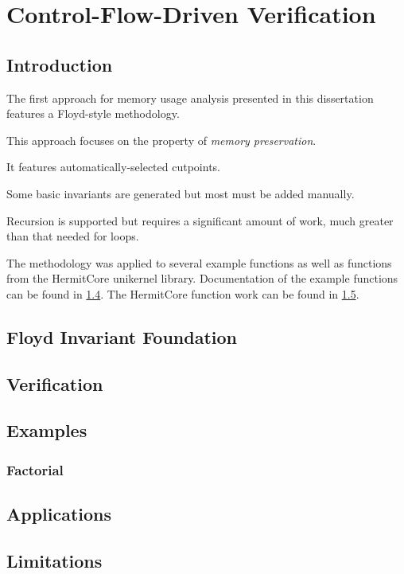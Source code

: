 \chapter{Control-Flow-Driven Verification}

\section{Introduction}\label{se:cfg_intro}
The first approach for memory usage analysis presented in this dissertation
features a Floyd-style methodology.

This approach focuses on the property of \emph{memory preservation}.

It features automatically-selected cutpoints.

Some basic invariants are generated but most must be added manually.

Recursion is supported but requires a significant amount of work,
much greater than that needed for loops.

The methodology was applied to several example functions
as well as functions from the HermitCore unikernel library.
Documentation of the example functions can be found in \cref{se:cfg_examples}.
The HermitCore function work can be found in \cref{se:cfg_applications}.

\section{Floyd Invariant Foundation}\label{se:cfg_invariant}

\section{Verification}\label{se:cfg_verification}

\section{Examples}\label{se:cfg_examples}
\subsection{Factorial}

\section{Applications}\label{se:cfg_applications}

\section{Limitations}
